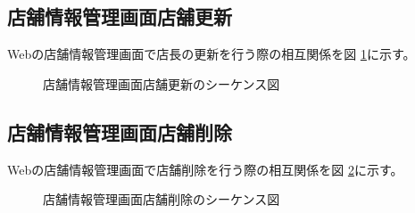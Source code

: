 \documentclass[a4j]{jarticle}
\begin{document}
\subsection{店舗情報管理画面店舗更新}
Webの店舗情報管理画面で店長の更新を行う際の相互関係を図 \ref {tab:oonishi3}に示す。
\begin{figure}[H]
\begin{center}
\caption{店舗情報管理画面店舗更新のシーケンス図}
\label{tab:oonishi3}
\end{center}
\end{figure}
\subsection{店舗情報管理画面店舗削除}
Webの店舗情報管理画面で店舗削除を行う際の相互関係を図 \ref {tab:oonishi4}に示す。
\begin{figure}[H]
\begin{center}
\caption{店舗情報管理画面店舗削除のシーケンス図}
\label{tab:oonishi4}
\end{center}
\end{figure}
\end{document}

